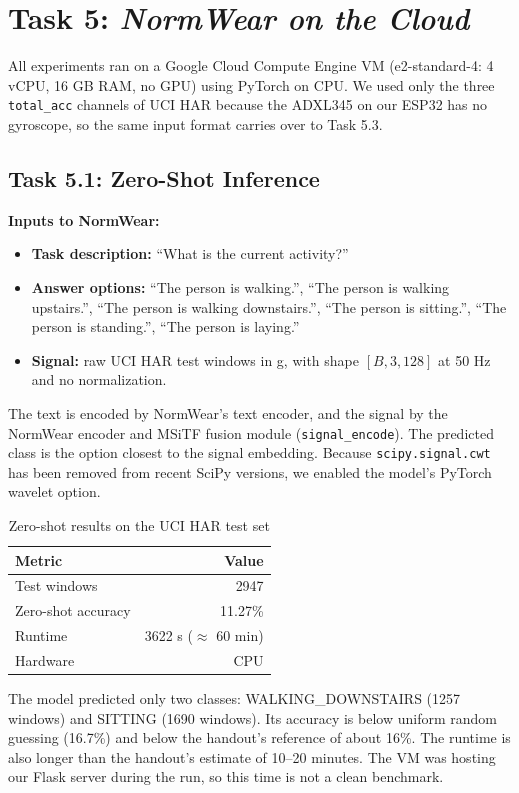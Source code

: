 \section{Task 5: \textit{NormWear on the Cloud}}

All experiments ran on a Google Cloud Compute Engine VM (e2-standard-4: 4 vCPU, 16 GB RAM, no GPU) using PyTorch on CPU. We used only the three \texttt{total\_acc} channels of UCI HAR because the ADXL345 on our ESP32 has no gyroscope, so the same input format carries over to Task 5.3.

\subsection{Task 5.1: Zero-Shot Inference}

\textbf{Inputs to NormWear:}
\begin{itemize}
    \item \textbf{Task description:} ``What is the current activity?''
    \item \textbf{Answer options:} ``The person is walking.'', ``The person is walking upstairs.'', ``The person is walking downstairs.'', ``The person is sitting.'', ``The person is standing.'', ``The person is laying.''
    \item \textbf{Signal:} raw UCI HAR test windows in g, with shape $[B, 3, 128]$ at 50 Hz and no normalization.
\end{itemize}

The text is encoded by NormWear's text encoder, and the signal by the NormWear encoder and MSiTF fusion module (\texttt{signal\_encode}). The predicted class is the option closest to the signal embedding. Because \texttt{scipy.signal.cwt} has been removed from recent SciPy versions, we enabled the model's PyTorch wavelet option.

\begin{table}[h]
\centering
\begin{tabular}{lr}
\toprule
Metric & Value \\
\midrule
Test windows & 2947 \\
Zero-shot accuracy & 11.27\% \\
Runtime & 3622 s ($\approx$ 60 min) \\
Hardware & CPU \\
\bottomrule
\end{tabular}
\caption{Zero-shot results on the UCI HAR test set}
\end{table}

The model predicted only two classes: WALKING\_DOWNSTAIRS (1257 windows) and SITTING (1690 windows). Its accuracy is below uniform random guessing (16.7\%) and below the handout's reference of about 16\%. The runtime is also longer than the handout's estimate of 10--20 minutes. The VM was hosting our Flask server during the run, so this time is not a clean benchmark.

